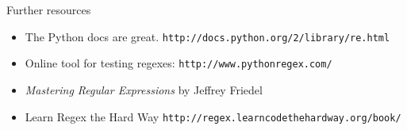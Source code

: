 \documentclass{beamer}
\begin{document}
\begin{frame}{Further resources}

\begin{itemize}
 \item The Python docs are great. \lstinline$http://docs.python.org/2/library/re.html$
 \item Online tool for testing regexes: \lstinline$http://www.pythonregex.com/$
 \item {\it Mastering Regular Expressions} by Jeffrey Friedel
 \item Learn Regex the Hard Way \lstinline$http://regex.learncodethehardway.org/book/$
\end{itemize}

\end{frame}
\end{document}
